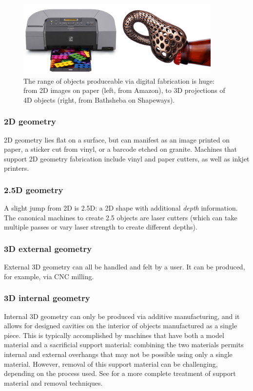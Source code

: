 \begin{figure}
\centering
\includegraphics[width=4in]{figures/range.png}
\caption{The range of objects produceable via digital fabrication is huge: from 2D images on paper (left, from Amazon), to 3D projections of 4D objects (right, from Bathsheba on Shapeways).}
\label{fig:range}
\end{figure}

\subsubsection{2D geometry}

2D geometry lies flat on a surface, but can manifest as an image printed on paper, a sticker cut from vinyl, or a barcode etched on granite. Machines that support 2D geometry fabrication include vinyl and paper cutters, as well as inkjet printers.

\subsubsection{2.5D geometry}

A slight jump from 2D is 2.5D: a 2D shape with additional \emph{depth} information. The canonical machines to create 2.5 objects are laser cutters (which can take multiple passes or vary laser strength to create different depths).

\subsubsection{3D external geometry}

External 3D geometry can all be handled and felt by a user. It can be produced, for example, via CNC milling.

\subsubsection{3D internal geometry}

Internal 3D geometry can only be produced via additive manufacturing, and it allows for designed cavities on the interior of objects manufactured as a single piece. This is typically accomplished by machines that have both a model material and a sacrificial support material: combining the two materials permits internal and external overhangs that may not be possible using only a single material. However, removal of this support material can be challenging, depending on the process used. See \cite{savage-sot} for a more complete treatment of support material and removal techniques.

